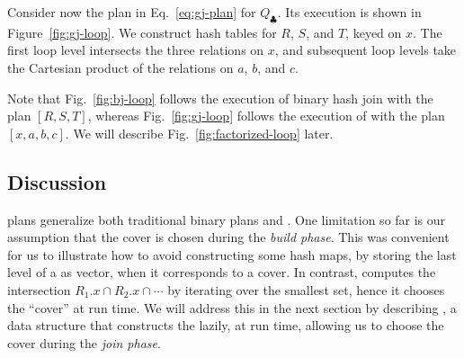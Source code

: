 \begin{example}\label{ex:generic-free-join}
  Consider now the plan in Eq.~\eqref{eq:gj-plan} for  $Q_\clubsuit$.
  Its execution is shown in Figure~\ref{fig:gj-loop}.
  We construct  hash tables for $R$, $S$, and $T$, keyed on $x$.
  The first loop level intersects the three relations on $x$,
  and subsequent loop levels take the Cartesian product of the relations on $a$, $b$, and $c$.
\end{example}

Note that Fig.~\ref{fig:bj-loop}
follows the execution of binary hash join with the plan $[R, S, T]$,
whereas Fig.~\ref{fig:gj-loop} follows the execution of \GJ
with the plan $[x, a, b, c]$.  We will describe
Fig.~\ref{fig:factorized-loop} later.

\subsection{Discussion}

\FJ plans generalize both traditional binary plans and \GJ.
One
limitation so far is our assumption that the cover is chosen during
the {\em build phase}.  This was convenient for us to illustrate how
to avoid constructing some hash maps, by storing the last level of a
\GHT as vector, when it corresponds to a cover.  In contrast, \GJ
computes the intersection $R_1.x\cap R_2.x\cap \cdots$ by iterating
over the smallest set, hence it chooses the ``cover'' at run time.  We
will address this in the next section by describing \COLT, a data
structure that constructs the \GHT lazily, at run time, allowing us to
choose the cover during the {\em join phase}.
